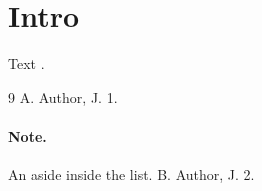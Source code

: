 \documentclass{article}
\begin{document}
\section{Intro}
Text \cite{a,b}.
\begin{thebibliography}{9}
 A. Author, J. 1.
\paragraph{Note.} An aside inside the list.
 B. Author, J. 2.
\end{thebibliography}
\end{document}
